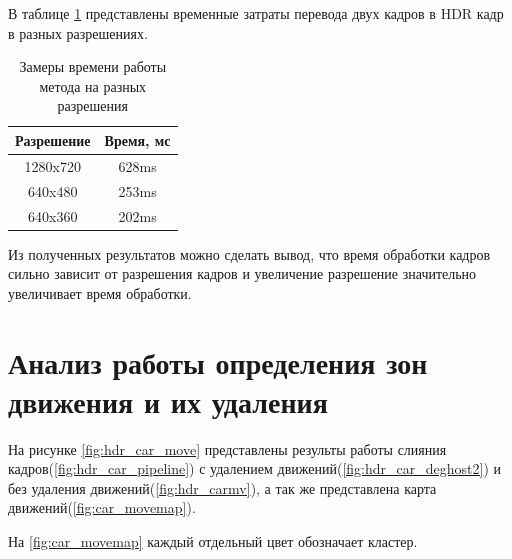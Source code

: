 В таблице \ref{table:resolutions} представлены временные затраты перевода двух кадров в HDR кадр в разных разрешениях.

\begin{table}
\caption{Замеры времени работы метода на разных разрешения}
\label{table:resolutions}
\begin{tabular}{cc}
\hline
\textbf{Разрешение} & \textbf{Время, мс} \\ \hline
1280x720 & 628ms \\ \hline
640x480 & 253ms \\
640x360 & 202ms
\end{tabular}
\end{table}

Из полученных результатов можно сделать вывод, что время обработки кадров сильно зависит от разрешения кадров и увеличение разрешение значительно увеличивает время обработки. 


\section{ Анализ работы определения зон движения и их удаления}

На рисунке \ref{fig:hdr_car_move} представлены результы работы слияния кадров(\ref{fig:hdr_car_pipeline}) с удалением движений(\ref{fig:hdr_car_deghost2}) и без удаления движений(\ref{fig:hdr_carmv}), а так же представлена карта движений(\ref{fig:car_movemap}).

На \ref{fig:car_movemap} каждый отдельный цвет обозначает кластер. 

